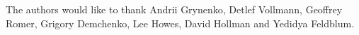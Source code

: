 
The authors would like to thank Andrii Grynenko, Detlef Vollmann, Geoffrey Romer,
Grigory Demchenko, Lee Howes, David Hollman and Yedidya Feldblum.
